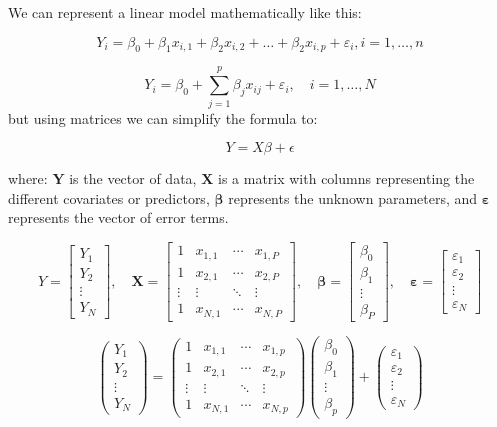 \documentclass[
  letterpaper,
  DIV=11,
  numbers=noendperiod]{scrartcl}
\begin{document}
We can represent a linear model mathematically like this:

\[ 
Y_i = \beta_0 + \beta_1 x_{i,1} + \beta_2 x_{i,2} + \dots +  \beta_2 x_{i,p} + \varepsilon_i, i=1,\dots,n 
\]

\[
Y_i = \beta_0 + \sum_{j=1}^{p} \beta_j x_{ij} + \varepsilon_i, \quad i = 1, \ldots, N
\] but using matrices we can simplify the formula to:

\[
Y=X \beta+\epsilon   
\]

where: \(\mathbf{Y}\) is the vector of data, \(\mathbf{X}\) is a matrix
with columns representing the different covariates or predictors,
\(\boldsymbol{\beta}\) represents the unknown parameters, and
\(\boldsymbol{\varepsilon}\) represents the vector of error terms.

\[
Y = \begin{bmatrix}
Y_1 \\
Y_2 \\
\vdots \\
Y_N
\end{bmatrix}, \quad
\mathbf{X} = \begin{bmatrix}
1 & x_{1,1} & \cdots & x_{1,P} \\
1 & x_{2,1} & \cdots & x_{2,P} \\
\vdots & \vdots & \ddots & \vdots \\
1 & x_{N,1} & \cdots & x_{N,P}
\end{bmatrix}, \quad
\boldsymbol{\beta} = \begin{bmatrix}
\beta_0 \\
\beta_1 \\
\vdots \\
\beta_P
\end{bmatrix}, \quad
\boldsymbol{\varepsilon} = \begin{bmatrix}
\varepsilon_1 \\
\varepsilon_2 \\
\vdots \\
\varepsilon_N
\end{bmatrix}
\]

\[
\begin{pmatrix}
Y_1 \\
Y_2 \\
\vdots \\
Y_N
\end{pmatrix}
=
\begin{pmatrix}
1 & x_{1,1} & \cdots & x_{1,p} \\
1 & x_{2,1} & \cdots & x_{2,p} \\
\vdots & \vdots & \ddots & \vdots \\
1 & x_{N,1} & \cdots & x_{N,p}
\end{pmatrix}
\begin{pmatrix}
\beta_0 \\
\beta_1 \\
\vdots \\
\beta_p
\end{pmatrix}
+
\begin{pmatrix}
\varepsilon_1 \\
\varepsilon_2 \\
\vdots \\
\varepsilon_N
\end{pmatrix}
\]
\end{document}
